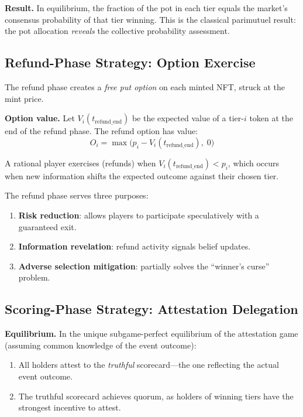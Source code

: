 \documentclass[11pt,a4paper]{article}
\begin{document}
\textbf{Result.} In equilibrium, the fraction of the pot in each tier equals the market's consensus probability of that tier winning. This is the classical parimutuel result: the pot allocation \emph{reveals} the collective probability assessment.

\subsection{Refund-Phase Strategy: Option Exercise}

The refund phase creates a \emph{free put option} on each minted NFT, struck at the mint price.

\textbf{Option value.} Let $V_i(t_{\text{refund\_end}})$ be the expected value of a tier-$i$ token at the end of the refund phase. The refund option has value:
\begin{equation}
O_i = \max\bigl(p_i - V_i(t_{\text{refund\_end}}),\; 0\bigr)
\end{equation}

A rational player exercises (refunds) when $V_i(t_{\text{refund\_end}}) < p_i$, which occurs when new information shifts the expected outcome against their chosen tier.

The refund phase serves three purposes:
\begin{enumerate}[nosep]
    \item \textbf{Risk reduction}: allows players to participate speculatively with a guaranteed exit.
    \item \textbf{Information revelation}: refund activity signals belief updates.
    \item \textbf{Adverse selection mitigation}: partially solves the ``winner's curse'' problem.
\end{enumerate}

\subsection{Scoring-Phase Strategy: Attestation Delegation}

\textbf{Equilibrium.} In the unique subgame-perfect equilibrium of the attestation game (assuming common knowledge of the event outcome):
\begin{enumerate}[nosep]
    \item All holders attest to the \emph{truthful} scorecard---the one reflecting the actual event outcome.
    \item The truthful scorecard achieves quorum, as holders of winning tiers have the strongest incentive to attest.
\end{enumerate}
\end{document}
